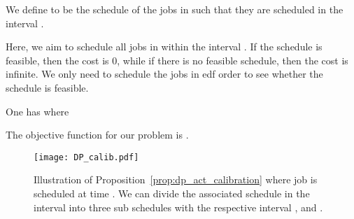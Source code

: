 \begin{definition}
We define  to be the schedule of the jobs in  such that they are scheduled in the interval . 
\end{definition}
Here, we aim to schedule all jobs in  within the interval . If the schedule is feasible, then the cost is 0, while if there is no feasible schedule, then the cost is infinite. We only need to schedule the jobs in {\sc edf} order to see whether the schedule is feasible.




\begin{prop}\label{prop:dp_act_calibration}
One has  where

\end{prop}

The objective function for our problem is
 .

\begin{figure*}[h!]
\centering
\texttt{[image: DP\_calib.pdf]}
\caption{Illustration of Proposition~\ref{prop:dp_act_calibration} where job  is scheduled at time . We can divide the associated schedule in the interval  into three sub schedules with the respective interval ,  and .}
\label{fig:dp_calibration}
\end{figure*}



